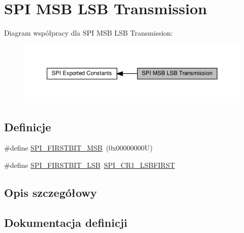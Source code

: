\hypertarget{group___s_p_i___m_s_b___l_s_b__transmission}{}\section{S\+PI M\+SB L\+SB Transmission}
\label{group___s_p_i___m_s_b___l_s_b__transmission}
Diagram współpracy dla S\+PI M\+SB L\+SB Transmission\+:\nopagebreak
\begin{figure}[H]
\begin{center}
\leavevmode
\includegraphics[width=350pt]{group___s_p_i___m_s_b___l_s_b__transmission}
\end{center}
\end{figure}
\subsection*{Definicje}
\begin{DoxyCompactItemize}
\item 
\#define \hyperlink{group___s_p_i___m_s_b___l_s_b__transmission_ga2280ac1a6ed587b516419b5df6a8ea55}{S\+P\+I\+\_\+\+F\+I\+R\+S\+T\+B\+I\+T\+\_\+\+M\+SB}~(0x00000000\+U)
\item 
\#define \hyperlink{group___s_p_i___m_s_b___l_s_b__transmission_ga8b608690a1adf9df40f271c228a479a3}{S\+P\+I\+\_\+\+F\+I\+R\+S\+T\+B\+I\+T\+\_\+\+L\+SB}~\hyperlink{group___peripheral___registers___bits___definition_gab929e9d5ddbb66f229c501ab18d0e6e8}{S\+P\+I\+\_\+\+C\+R1\+\_\+\+L\+S\+B\+F\+I\+R\+ST}
\end{DoxyCompactItemize}


\subsection{Opis szczegółowy}


\subsection{Dokumentacja definicji}
\mbox{\label{group___s_p_i___m_s_b___l_s_b__transmission_ga8b608690a1adf9df40f271c228a479a3}} 
